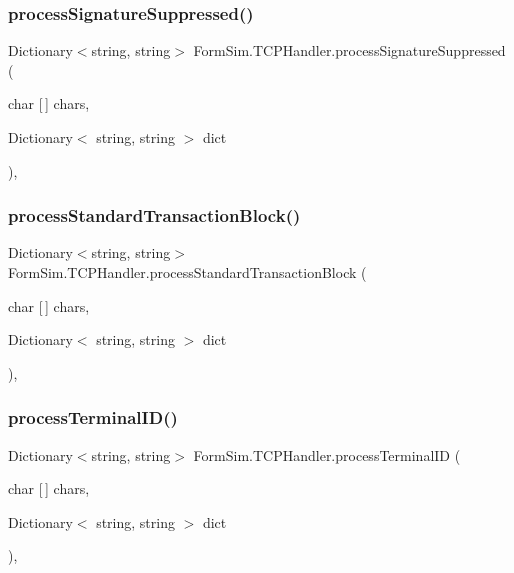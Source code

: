 \subsubsection{\texorpdfstring{process\+Signature\+Suppressed()}{processSignatureSuppressed()}}
{\footnotesize\ttfamily Dictionary$<$string, string$>$ Form\+Sim.\+T\+C\+P\+Handler.\+process\+Signature\+Suppressed (\begin{DoxyParamCaption}\item[{char \mbox{[}$\,$\mbox{]}}]{chars,  }\item[{Dictionary$<$ string, string $>$}]{dict }\end{DoxyParamCaption})\hspace{0.3cm}{\ttfamily [inline]}, {\ttfamily [private]}}

\mbox{\label{class_form_sim_1_1_t_c_p_handler_ab1ebfa369393b79fda9bf02f2c1e4a94}} 
\subsubsection{\texorpdfstring{process\+Standard\+Transaction\+Block()}{processStandardTransactionBlock()}}
{\footnotesize\ttfamily Dictionary$<$string, string$>$ Form\+Sim.\+T\+C\+P\+Handler.\+process\+Standard\+Transaction\+Block (\begin{DoxyParamCaption}\item[{char \mbox{[}$\,$\mbox{]}}]{chars,  }\item[{Dictionary$<$ string, string $>$}]{dict }\end{DoxyParamCaption})\hspace{0.3cm}{\ttfamily [inline]}, {\ttfamily [private]}}

\mbox{\label{class_form_sim_1_1_t_c_p_handler_a788a14473a58218eded09dcb8ab46fa3}} 
\subsubsection{\texorpdfstring{process\+Terminal\+I\+D()}{processTerminalID()}}
{\footnotesize\ttfamily Dictionary$<$string, string$>$ Form\+Sim.\+T\+C\+P\+Handler.\+process\+Terminal\+ID (\begin{DoxyParamCaption}\item[{char \mbox{[}$\,$\mbox{]}}]{chars,  }\item[{Dictionary$<$ string, string $>$}]{dict }\end{DoxyParamCaption})\hspace{0.3cm}{\ttfamily [inline]}, {\ttfamily [private]}}


